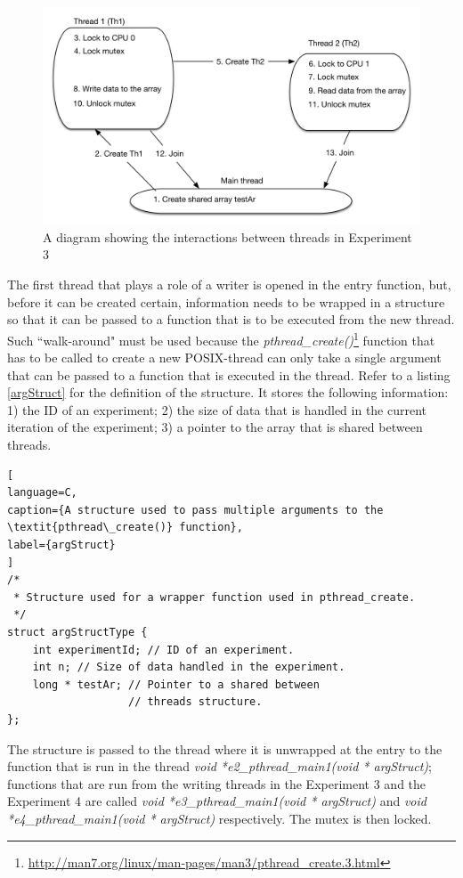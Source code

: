 \begin{figure}[ht!]
\centering
\includegraphics[width=145mm]{4/flow_threads_app_experiment.png}
\caption{A diagram showing the interactions between threads in Experiment 3}
\label{flow_threads_app_experiment}
\end{figure}

The first thread that plays a role of a writer is opened in the entry function, but, before it can be created certain, information needs to be wrapped in a structure so that it can be passed to a function that is to be executed from the new thread. Such ``walk-around" must be used because the \textit{pthread\_create()}\footnote{\url{http://man7.org/linux/man-pages/man3/pthread_create.3.html}} function that has to be called to create a new POSIX-thread can only take a single argument that can be passed to a function that is executed in the thread. Refer to a listing \ref{argStruct} for the definition of the structure. It stores the following information: 1) the ID of an experiment; 2) the size of data that is handled in the current iteration of the experiment; 3) a pointer to the array that is shared between threads.

\begin{lstlisting}[
language=C,
caption={A structure used to pass multiple arguments to the \textit{pthread\_create()} function},
label={argStruct}
]
/*
 * Structure used for a wrapper function used in pthread_create.
 */
struct argStructType {
	int experimentId; // ID of an experiment.
	int n; // Size of data handled in the experiment.
	long * testAr; // Pointer to a shared between
	               // threads structure.
};
\end{lstlisting}

The structure is passed to the thread where it is unwrapped at the entry to the function that is run in the thread \textit{void *e2\_pthread\_main1(void * argStruct)}; functions that are run from the writing threads in the Experiment 3 and the Experiment 4 are called \textit{void *e3\_pthread\_main1(void * argStruct)} and \textit{void *e4\_pthread\_main1(void * argStruct)} respectively. The mutex is then locked.

